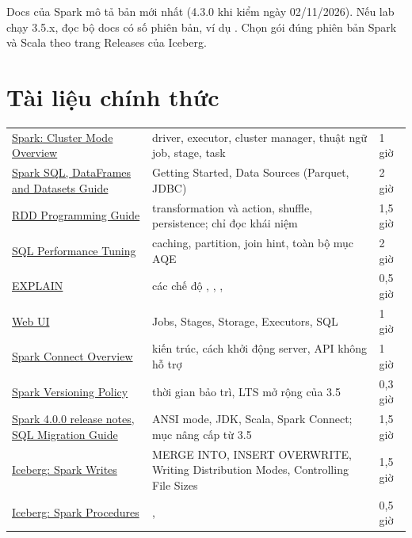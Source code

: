 \begin{ghichu}
Docs  của Spark mô tả bản mới nhất (4.3.0 khi kiểm ngày 02/11/2026). Nếu lab chạy 3.5.x, đọc bộ docs có số phiên bản, ví dụ . Chọn gói  đúng phiên bản Spark và Scala theo trang Releases của Iceberg.
\end{ghichu}

\section{Tài liệu chính thức}
\begin{xltabular}{\textwidth}{@{}P{4.6cm} L P{1.8cm}@{}}
\toprule
{} &  &  \\
\midrule
\endhead
\bottomrule
\endfoot
\href{https://spark.apache.org/docs/latest/cluster-overview.html}{Spark: Cluster Mode Overview} & driver, executor, cluster manager, thuật ngữ job, stage, task & 1 giờ \\
\href{https://spark.apache.org/docs/latest/sql-programming-guide.html}{Spark SQL, DataFrames and Datasets Guide} & Getting Started, Data Sources (Parquet, JDBC) & 2 giờ \\
\href{https://spark.apache.org/docs/latest/rdd-programming-guide.html}{RDD Programming Guide} & transformation và action, shuffle, persistence; chỉ đọc khái niệm & 1,5 giờ \\
\href{https://spark.apache.org/docs/latest/sql-performance-tuning.html}{SQL Performance Tuning} & caching, partition, join hint, toàn bộ mục AQE & 2 giờ \\
\href{https://spark.apache.org/docs/latest/sql-ref-syntax-qry-explain.html}{EXPLAIN} & các chế độ , , ,  & 0,5 giờ \\
\href{https://spark.apache.org/docs/latest/web-ui.html}{Web UI} & Jobs, Stages, Storage, Executors, SQL & 1 giờ \\
\href{https://spark.apache.org/docs/latest/spark-connect-overview.html}{Spark Connect Overview} & kiến trúc, cách khởi động server, API không hỗ trợ & 1 giờ \\
\href{https://spark.apache.org/versioning-policy.html}{Spark Versioning Policy} & thời gian bảo trì, LTS mở rộng của 3.5 & 0,3 giờ \\
\href{https://spark.apache.org/releases/spark-release-4-0-0.html}{Spark 4.0.0 release notes}, \href{https://spark.apache.org/docs/latest/sql-migration-guide.html}{SQL Migration Guide} & ANSI mode, JDK, Scala, Spark Connect; mục nâng cấp từ 3.5 & 1,5 giờ \\
\href{https://iceberg.apache.org/docs/latest/spark-writes/}{Iceberg: Spark Writes} & MERGE INTO, INSERT OVERWRITE, Writing Distribution Modes, Controlling File Sizes & 1,5 giờ \\
\href{https://iceberg.apache.org/docs/latest/spark-procedures/}{Iceberg: Spark Procedures} & ,  & 0,5 giờ \\
\end{xltabular}


